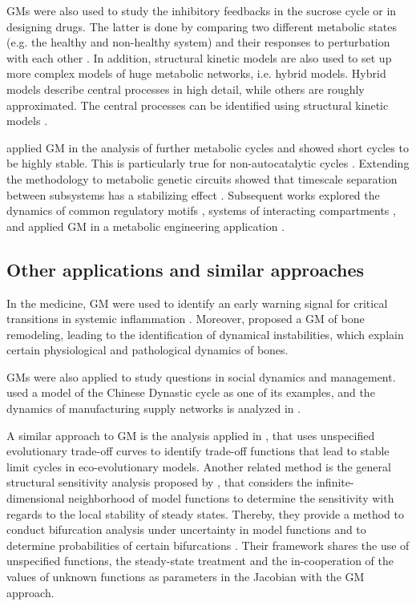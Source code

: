 \documentclass{article}
\begin{document}
GMs were also used to study the inhibitory feedbacks in the sucrose cycle \citep{Henkel2011EURASIP} or in designing drugs. The latter 
is done by comparing two different metabolic states (e.g. the healthy and non-healthy system)
and their responses to perturbation with each other \citep{Murabito2011Interface, Murabito2013CSSB}. 
In addition, structural kinetic models are also used to set up more complex models of huge metabolic networks, i.e. hybrid models. 
Hybrid models describe central processes in high detail, while others
are roughly approximated. The central processes can be identified using structural kinetic models \citep{Bulik2009FEBS}.

\citet{Reznik2010JTB} applied GM in the analysis of further metabolic cycles and showed short cycles to be highly stable. This is particularly true for non-autocatalytic cycles \citep{Reznik2013JRSI}. 
Extending the methodology to metabolic genetic circuits showed that timescale separation between subsystems has a stabilizing effect \citep{Reznik2013Chaos}.
Subsequent works explored the dynamics of common regulatory motifs \citep{Zumsande2010JTB,Gehrmann2010PRE,Ackermann2012EPJ}, systems of interacting compartments \citep{Fuertauer2016TheoryBiosci}, and applied GM in a metabolic engineering application \citep{ye2015dynamics}. 

\subsection{Other applications and similar approaches}
In the medicine, GM were used to identify an early warning signal for critical transitions in systemic inflammation \citep{scheff2013predicting}. Moreover, \citet{zumsande2011general} proposed a GM of bone remodeling, leading to the identification of dynamical instabilities, which explain certain physiological and pathological dynamics of bones. 

GMs were also applied to study questions in social dynamics and management. \citet{Gross2006PRE} used a model of the Chinese Dynastic cycle as one of its examples, and the dynamics of manufacturing supply networks is analyzed in \citet{ritterskamp2018revealing, demirel2019identifying}.

A similar approach to GM is the analysis applied in \cite{Kisdi2013140}, that uses unspecified evolutionary trade-off curves to identify trade-off functions that lead to stable limit cycles in eco-evolutionary models. Another related method is the general structural sensitivity analysis proposed by \cite{Adamson2014JMB}, that considers the infinite-dimensional neighborhood of model functions to determine the sensitivity with regards to the local stability of steady states. Thereby, they provide a method to conduct bifurcation analysis under uncertainty in model functions and to determine probabilities of certain bifurcations \citep{Adamson2014BMB}. Their framework shares the use of unspecified functions, the steady-state treatment and the in-cooperation of the values of unknown functions as parameters in the Jacobian with the GM approach. 
\end{document}
